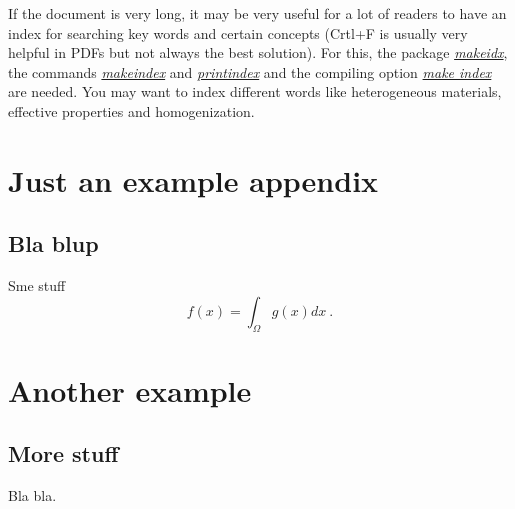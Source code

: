 \documentclass[a4paper]{book}
\newcommand{\imp}[1]{\underline{\textit{#1}}}
\begin{document}
If the document is very long, it may be very useful for a lot of readers to have an index for searching key words and certain concepts (Crtl+F is usually very helpful in PDFs but not always the best solution). For this, the  package \imp{makeidx}, the commands \imp{makeindex} and \imp{printindex} and the compiling option \imp{make index} are needed. You may want to index different words like heterogeneous materials, effective properties and homogenization.


\begin{appendix}


\chapter{Just an example appendix}
\label{app_ex1}


\section{Bla blup}

Sme stuff
\begin{equation}
	f(x) = \int_{\Omega} g(x) dx \ .
\end{equation}


\chapter{Another example}
\label{app_ex2}


\section{More stuff}

Bla bla.

\end{appendix}
\end{document}
